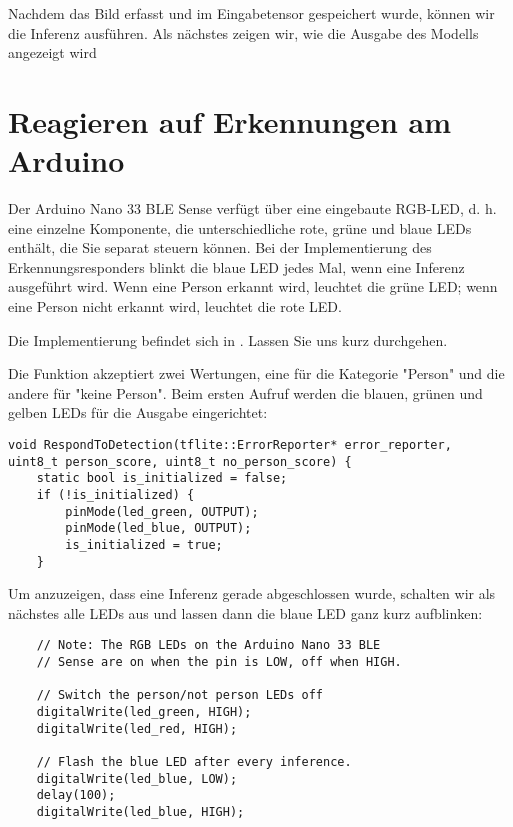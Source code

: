 Nachdem das Bild erfasst und im Eingabetensor gespeichert wurde, können wir die Inferenz ausführen. Als nächstes zeigen wir, wie die Ausgabe des Modells angezeigt wird

\section{Reagieren auf Erkennungen am Arduino}

Der Arduino Nano 33 BLE Sense verfügt über eine eingebaute RGB-LED, d. h. eine einzelne Komponente, die unterschiedliche rote, grüne und blaue LEDs enthält, die Sie separat steuern können. Bei der Implementierung des Erkennungsresponders blinkt die blaue LED jedes Mal, wenn eine Inferenz ausgeführt wird. Wenn eine Person erkannt wird, leuchtet die grüne LED; wenn eine Person nicht erkannt wird, leuchtet die rote LED.

Die Implementierung befindet sich in . Lassen Sie uns kurz durchgehen.

Die Funktion  akzeptiert zwei Wertungen, eine für die Kategorie "Person" und die andere für "keine Person". Beim ersten Aufruf werden die blauen, grünen und gelben LEDs für die Ausgabe eingerichtet:

\begin{code}
    \begin{lstlisting}
void RespondToDetection(tflite::ErrorReporter* error_reporter,
uint8_t person_score, uint8_t no_person_score) {
    static bool is_initialized = false;
    if (!is_initialized) {
        pinMode(led_green, OUTPUT);
        pinMode(led_blue, OUTPUT);
        is_initialized = true;
    }
  \end{lstlisting}
\end{code}

    Um anzuzeigen, dass eine Inferenz gerade abgeschlossen wurde, schalten wir als nächstes alle LEDs aus und lassen dann die blaue LED ganz kurz aufblinken:
    
\begin{code}
    \begin{lstlisting}
    // Note: The RGB LEDs on the Arduino Nano 33 BLE
    // Sense are on when the pin is LOW, off when HIGH.
    
    // Switch the person/not person LEDs off
    digitalWrite(led_green, HIGH);
    digitalWrite(led_red, HIGH);
    
    // Flash the blue LED after every inference.
    digitalWrite(led_blue, LOW);
    delay(100);
    digitalWrite(led_blue, HIGH);
  \end{lstlisting}
\end{code}

